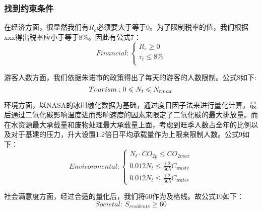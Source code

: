 \documentclass[12pt]{article}  %
\begin{document}
\subsubsection{找到约束条件}
在经济方面，很显然我们有$R_e$必须要大于等于0。为了限制税率的值，我们根据xxx得出税率应小于等于8\%。因此有公式7：
\begin{equation}
	Financial:
	\begin{cases}
		R_{e}\geqslant 0 \\
		\tau_{t}\leqslant 8\% \\
	\end{cases}
\end{equation}

游客人数方面，我们依据朱诺市的政策\cite{6}得出了每天的游客的人数限制。公式8如下:
\begin{equation}
	Tourism:
		0\leqslant N_{t}\leqslant N_{tmax}\\
\end{equation}

环境方面，以NASA的冰川融化数据\cite{7}为基础，通过度日因子法来进行量化计算，最后通过二氧化碳影响温度进而影响速度的因素来限定了二氧化碳的最大排放量。而在水资源最大承载量和废物处理最大承载量上面，考虑到旺季人数占全年的比例以及对于基建的压力，升大设置1.2倍日平均承载量作为上限来限制人数。公式9如下：
\begin{equation}
	Environmental:
	\begin{cases}
		N_{t}\cdot CO_{2p}\leqslant CO_{2max} \\
		0.012N_t\leqslant \frac{1.2}{365}C_{waste} \\
		0.012N_t\leqslant \frac{1.2}{365}C_{water}
	\end{cases}
\end{equation}

社会满意度方面，经过合适的量化后，我们将60作为及格线。故公式10如下：
\begin{equation}
	Societal:\ S_{residents} \geqslant 60
\end{equation}	
\end{document}
